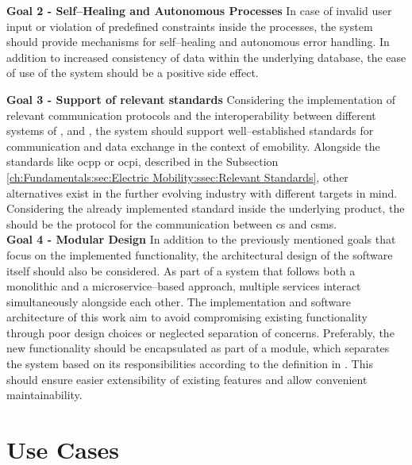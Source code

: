 \noindent \textbf{Goal 2 - Self--Healing and Autonomous Processes} In case of invalid user input or violation of predefined constraints inside the processes, the system should provide mechanisms for self--healing and autonomous error handling.
In addition to increased consistency of data within the underlying database, the ease of use of the system should be a positive side effect. \\

\newpage

\noindent \textbf{Goal 3 - Support of relevant standards} Considering the implementation of relevant communication protocols and the interoperability between different systems of ,  and , the system should support well--established standards for communication and data exchange in the context of \acrshort{emobility}.
Alongside the standards like \acrshort{ocpp} or \acrshort{ocpi}, described in the Subsection \ref{ch:Fundamentals:sec:Electric Mobility:ssec:Relevant Standards}, other alternatives exist in the further evolving industry with different targets in mind.
Considering the already implemented standard inside the underlying product, the  should be the protocol for the communication between \acrshort{cs} and \acrshort{csms}. \\

\noindent \textbf{Goal 4 - Modular Design} In addition to the previously mentioned goals that focus on the implemented functionality, the architectural design of the software itself should also be considered.
As part of a system that follows both a monolithic and a microservice--based approach, multiple services interact simultaneously alongside each other. The implementation and software architecture of this work aim to avoid compromising existing functionality through poor design choices or neglected separation of concerns.
Preferably, the new functionality should be encapsulated as part of a module, which separates the system based on its responsibilities according to the definition in \cite{clements_documenting_2011}. This should ensure easier extensibility of existing features and allow convenient maintainability.

\newpage

\section{Use Cases}
\label{ch:Requirements Engineering:sec:Use Cases}

